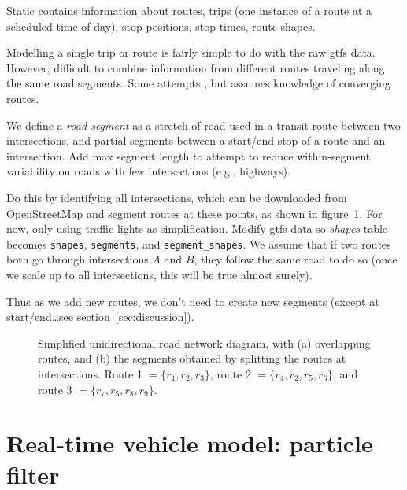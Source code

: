 \documentclass[draftcls,a4paper,onecolumn]{IEEEtran}\usepackage[]{graphicx}\usepackage[]{color}
\newenvironment{knitrout}{}{} %
\begin{document}
Static contains information about routes, 
trips (one instance of a route at a scheduled time of day),
stop positions, stop times, route shapes.

Modelling a single trip or route is fairly simple to do with the raw \gls{gtfs} data.
However, difficult to combine information from different routes traveling along the same road segments.
Some attempts \cite{Yu_2011}, but assumes knowledge of converging routes.

We define a \emph{road segment} as a stretch of road used in a transit route between two intersections,
and partial segments between a start/end stop of a route and an intersection.
Add max segment length to attempt to reduce within-segment variability on roads with few intersections 
(e.g., highways).

Do this by identifying all intersections,
which can be downloaded from OpenStreetMap \cite{OpenStreetMap_2017}
and segment routes at these points,
as shown in figure~\ref{fig:route_segmentation}.
For now, only using traffic lights as simplification.
Modify \gls{gtfs} data so \emph{shapes} table becomes
\texttt{shapes}, \texttt{segments}, and \texttt{segment\_shapes}.
We assume that if two routes both go through intersections $A$ and $B$,
they follow the same road to do so
(once we scale up to all intersections, this will be true almost surely).

Thus as we add new routes, we don't need to create new segments
(except at start/end\ldots see section~\ref{sec:discussion}).


\begin{knitrout}
\color{fgcolor}\begin{figure}
\caption[Simplied diagram of overlapping routes]{Simplified unidirectional road network diagram, with (a) overlapping routes, and (b) the segments obtained by splitting the routes at intersections. Route 1 $ = \{r_1, r_2, r_3\}$, route 2 $=\{r_4,r_2,r_5,r_6\}$, and route 3 $=\{r_7,r_5,r_8,r_9\}$.}\label{fig:route_segmentation}
\end{figure}


\end{knitrout}



\section{Real-time vehicle model: particle filter}
\label{sec:pf}
\end{document}
